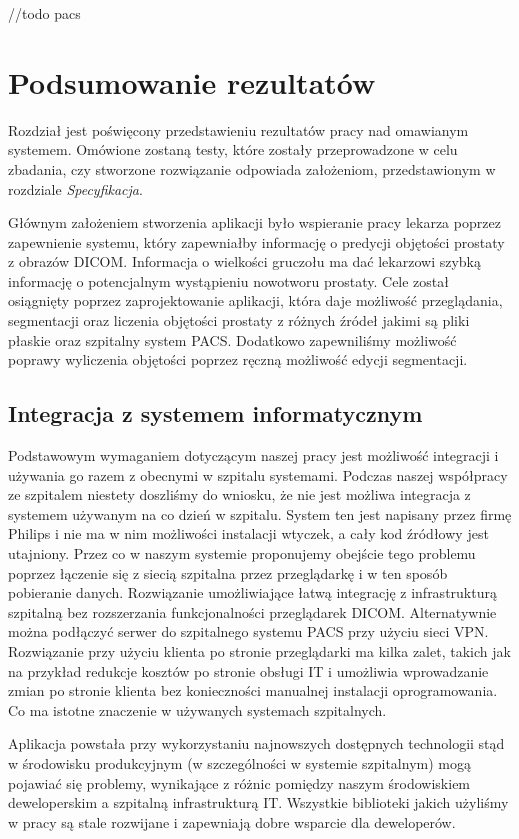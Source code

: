 \documentclass[a4paper,11pt,twoside]{report}
\theoremstyle{definition}
\begin{document}
//todo pacs


\chapter{Podsumowanie rezultatów}
Rozdział jest poświęcony przedstawieniu rezultatów pracy nad omawianym systemem. Omówione zostaną testy, które zostały przeprowadzone w celu zbadania, czy stworzone rozwiązanie odpowiada założeniom, przedstawionym w rozdziale \textit{Specyfikacja}. 
\par
Głównym założeniem stworzenia aplikacji było wspieranie pracy lekarza poprzez zapewnienie systemu, który zapewniałby informację o predycji objętości prostaty z obrazów DICOM. Informacja o wielkości gruczołu ma dać lekarzowi szybką informację o potencjalnym wystąpieniu nowotworu prostaty. Cele został osiągnięty poprzez zaprojektowanie aplikacji, która daje możliwość przeglądania, segmentacji oraz liczenia objętości prostaty z różnych źródeł jakimi są pliki płaskie oraz szpitalny system PACS. Dodatkowo zapewniliśmy możliwość poprawy wyliczenia objętości poprzez ręczną możliwość edycji segmentacji. 

\section{Integracja z systemem informatycznym}
Podstawowym wymaganiem dotyczącym naszej pracy jest możliwość integracji i używania go razem z obecnymi w szpitalu systemami. Podczas naszej współpracy ze szpitalem niestety doszliśmy do wniosku, że nie jest możliwa integracja z systemem używanym na co dzień w szpitalu. System ten jest napisany przez firmę Philips i nie ma w nim możliwości instalacji wtyczek, a cały kod źródłowy jest utajniony. Przez co w naszym systemie proponujemy obejście tego problemu poprzez łączenie się z siecią szpitalna przez przeglądarkę i w ten sposób pobieranie danych. Rozwiązanie umożliwiające łatwą integrację z infrastrukturą szpitalną bez rozszerzania funkcjonalności przeglądarek DICOM. Alternatywnie można podłączyć serwer do szpitalnego systemu PACS przy użyciu sieci VPN. 
Rozwiązanie przy użyciu klienta po stronie przeglądarki ma kilka zalet, takich jak na przykład redukcje kosztów po stronie obsługi IT i umożliwia wprowadzanie zmian po stronie klienta bez konieczności manualnej instalacji oprogramowania. Co ma istotne znaczenie w używanych systemach szpitalnych.
\par
Aplikacja powstała przy wykorzystaniu najnowszych dostępnych technologii stąd w środowisku produkcyjnym (w szczególności w systemie szpitalnym) mogą pojawiać się problemy, wynikające z różnic pomiędzy naszym środowiskiem deweloperskim a szpitalną infrastrukturą IT. Wszystkie biblioteki jakich użyliśmy w pracy są stale rozwijane i zapewniają dobre wsparcie dla deweloperów. 
 
\end{document}
